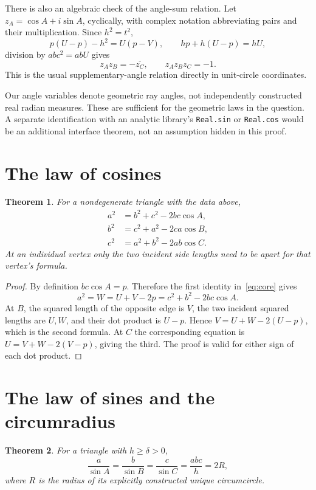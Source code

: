 \documentclass[11pt,a4paper]{article}
\newtheorem{theorem}{Theorem}[section]
\theoremstyle{definition}
\newcommand{\code}[1]{\texttt{\small #1}}
\numberwithin{equation}{section}
\begin{document}
There is also an algebraic check of the angle-sum relation. Let
\(z_A=\cos A+i\sin A\), cyclically, with complex notation
abbreviating pairs and their multiplication. Since \(h^2=t^2\),
\[
 p(U-p)-h^2=U(p-V),\qquad hp+h(U-p)=hU,
\]
division by \(abc^2=abU\) gives
\[
 z_Az_B=-\overline{z_C},\qquad z_Az_Bz_C=-1.
 \tag{4.11}\label{eq:angle-sum}
\]
This is the usual supplementary-angle relation directly in
unit-circle coordinates.

Our angle variables denote geometric ray angles, not independently
constructed real radian measures. These are sufficient for the
geometric laws in the question. A separate identification with an
analytic library's \code{Real.sin} or \code{Real.cos} would be an
additional interface theorem, not an assumption hidden in this proof.

\section{The law of cosines}

\begin{theorem}\label{thm:cos}
For a nondegenerate triangle with the data above,
\begin{align*}
 a^2&=b^2+c^2-2bc\cos A,\\
 b^2&=c^2+a^2-2ca\cos B,\\
 c^2&=a^2+b^2-2ab\cos C.
\end{align*}
At an individual vertex only the two incident side lengths need
to be apart for that vertex's formula.
\end{theorem}

\begin{proof}
By definition \(bc\cos A=p\). Therefore the first identity
in~\eqref{eq:core} gives
\[
 a^2=W=U+V-2p=c^2+b^2-2bc\cos A.
\]
At \(B\), the squared length of the opposite edge is \(V\),
the two incident squared lengths are \(U,W\), and their dot
product is \(U-p\). Hence
\(V=U+W-2(U-p)\), which is the second formula.
At \(C\) the corresponding equation is
\(U=V+W-2(V-p)\), giving the third.
The proof is valid for either sign of each dot product.
\end{proof}

\section{The law of sines and the circumradius}

\begin{theorem}\label{thm:sine}
For a triangle with \(h\ge\delta>0\),
\[
 \frac{a}{\sin A}=\frac{b}{\sin B}
 =\frac{c}{\sin C}=\frac{abc}{h}=2R,
\]
where \(R\) is the radius of its explicitly constructed unique
circumcircle.
\end{theorem}
\end{document}
